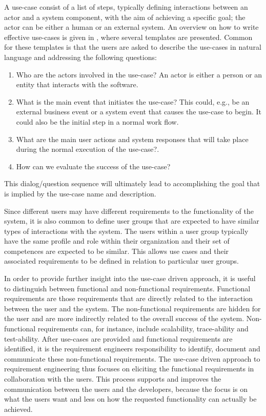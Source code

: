 A use-case consist of a list of steps, typically defining interactions between an actor and a system component, with the aim of
achieving a specific  goal; the actor can be either a human or an external system.  An overview on how to write
effective use-cases is given in \cite{Coc01}, where several templates are presented. Common for these templates is that
the users are asked to describe the use-cases in natural language and addressing the following questions:
\begin{enumerate}
\item Who are the actors involved in the use-case? An actor is either a person or an entity that interacts with the software.  
\item What is the main event that initiates the use-case? This could, e.g., be an external business event or a system event that causes the use-case to begin.  It could also be the initial step in a normal work flow. 
\item What are the main user actions and system responses that will take place during the normal execution of the use-case?. 
\item How can we evaluate the success of the use-case?
\end{enumerate}
This dialog/question sequence will ultimately lead to accomplishing the goal that is implied by the use-case name and description.

Since different users may have different requirements to the functionality of the system, it is also common to define
user groups that are expected to have similar types of interactions with the system. The users
within a user group typically have the same profile and role within their organization and their set of competences are expected to
be similar. This allows use cases and their associated requirements to be defined in relation to particular user groups.

In order to provide further insight into the use-case driven approach, it is useful to distinguish between functional and non-functional
requirements.  Functional requirements are those requirements that are directly related to the interaction between the
user and the system.  The non-functional requirements are hidden for the user and are more indirectly related to the  overall
success of the system.  Non-functional requirements can, for instance, include scalability, trace-ability and test-ability.  After use-cases are provided and functional
requirements are identified, it is the requirement engineers responsibility to identify, document and communicate these
non-functional requirements.  The use-case driven approach to requirement engineering thus focuses on eliciting the
functional requirements in collaboration with the users.  This process supports and improves the communication between the users and the developers,
because the focus is on what the users want and less on how the requested functionality can actually be achieved.
